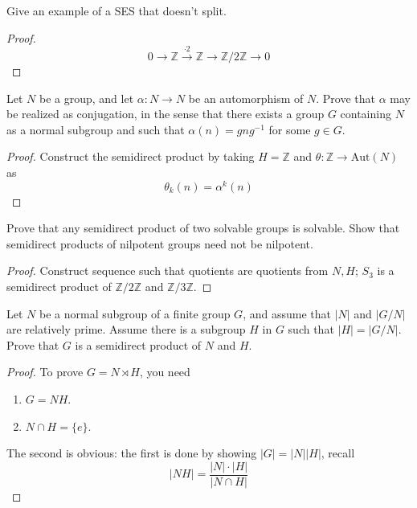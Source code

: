 \documentclass[openany]{book}
\newcommand{\Z}{\mathbb{Z}}
\begin{document}
\begin{prob}[5.4]
    Give an example of a SES that doesn't split.
\end{prob}
\begin{proof}
    \[0 \longrightarrow \mathbb{Z} \xrightarrow{\cdot 2} \mathbb{Z} \longrightarrow \mathbb{Z}/2\mathbb{Z} \longrightarrow 0\]
\end{proof}

\begin{prob}[5.7]
    Let $N$ be a group, and let $\alpha : N \to N$ be an automorphism of $N$. Prove that $\alpha$ may be realized as conjugation, in the sense that there exists a group $G$ containing $N$ as a normal subgroup and such that $\alpha(n) = gng^{-1}$ for some $g \in G$.
\end{prob}
\begin{proof}
    Construct the semidirect product by taking $H=\Z$ and $\theta:\Z\to\text{Aut}(N)$ as 
    \begin{equation*}
        \theta_k(n)=\alpha^k(n)
    \end{equation*}
\end{proof}


\begin{prob}[5.8]
    Prove that any semidirect product of two solvable groups is solvable. Show that semidirect products of nilpotent groups need not be nilpotent.
\end{prob}
\begin{proof}
    Construct sequence such that quotients are quotients from $N,H$; $S_3$ is a semidirect product of $\Z/2\Z$ and $\Z/3\Z$.
\end{proof}

\begin{prob}[5.10]
    Let $N$ be a normal subgroup of a finite group $G$, and assume that $|N|$ and $|G/N|$ are relatively prime. Assume there is a subgroup $H$ in $G$ such that $|H| = |G/N|$. Prove that $G$ is a semidirect product of $N$ and $H$.
    \end{prob}
\begin{proof}
    To prove $G=N\rtimes H$, you need 
    \begin{enumerate}
        \item $G=NH$.
        \item $N\cap H=\{e\}$.
    \end{enumerate}
    The second is obvious: the first is done by showing $|G|=|N||H|$, recall 
    \begin{equation*}
        |NH|=\frac{|N|\cdot|H|}{|N\cap H|}
    \end{equation*}
\end{proof}
    
\end{document}

